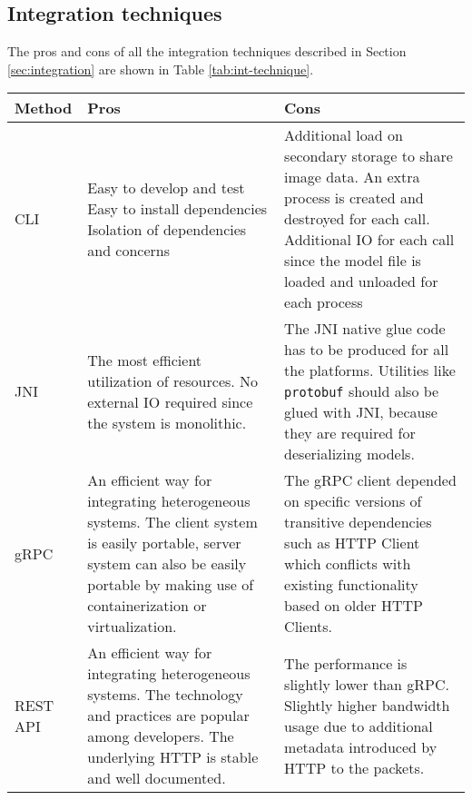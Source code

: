 \subsection{Integration techniques}
The pros and cons of all the integration techniques described in Section \ref{sec:integration} are shown in Table \ref{tab:int-technique}.
\begin{table*}[bt]
	\centering
	\begin{tabularx}{\textwidth}{
			|p{}%
			|p{}%
			|p{}|%
		} \hline
		\textbf{Method} & \textbf{Pros} & \textbf{Cons} \\ \hline
		CLI 
		& \tabitem Easy to develop and test \newline
		\tabitem Easy to install dependencies \newline
		\tabitem Isolation of dependencies and concerns
		& 
		\tabitem Additional load on secondary storage to share image data. \newline
		\tabitem An extra process is created and destroyed for each call. \newline
		\tabitem Additional IO for each call since the model file is loaded and unloaded for each process  
		\\ \hline
		JNI
		& 
		\tabitem The most efficient utilization of resources. \newline 
		\tabitem No external IO required since the system is monolithic.
		& 
		\tabitem The JNI native glue code has to be produced for all the platforms. \newline
		\tabitem Utilities like \texttt{protobuf} should also be glued with JNI, because they are required for deserializing models\cite{javacpp-240}.
		\\ \hline
		gRPC
		&
		\tabitem An efficient way for integrating heterogeneous systems. \newline 
		\tabitem The client system is easily portable, server system can also be easily portable by making use of containerization or virtualization. 
		& 
		\tabitem The gRPC client depended on specific versions of transitive dependencies such as HTTP Client which conflicts with existing functionality based on older HTTP Clients.
		\\ \hline
		REST API
		&
		\tabitem An efficient way for integrating heterogeneous systems. \newline 
		\tabitem The technology and practices are popular among developers. \newline 
		\tabitem The underlying HTTP is stable and well documented.
		&
		\tabitem The performance is slightly lower than gRPC. \newline
		\tabitem Slightly higher bandwidth usage due to additional metadata introduced by HTTP to the packets.
		\\ \hline
	\end{tabularx}
\caption{Brief comparison of integration techniques}
\label{tab:int-technique}
\end{table*}

